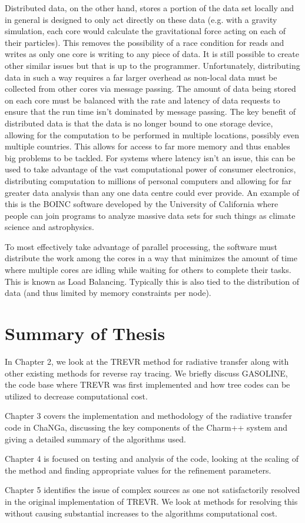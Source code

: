 Distributed data, on the other hand, stores a portion of the data set locally and in general is designed to only act directly on these data (e.g. with a gravity simulation, each core would calculate the gravitational force acting on each of their particles). This removes the possibility of a race condition for reads and writes as only one core is writing to any piece of data. It is still possible to create other similar issues but that is up to the programmer. Unfortunately, distributing data in such a way requires a far larger overhead as non-local data must be collected from other cores via message passing. The amount of data being stored on each core must be balanced with the rate and latency of data requests to ensure that the run time isn't dominated by message passing. The key benefit of distributed data is that the data is no longer bound to one storage device, allowing for the computation to be performed in multiple locations, possibly even multiple countries. This allows for access to far more memory and thus enables big problems to be tackled. For systems where latency isn't an issue, this can be used to take advantage of the vast computational power of consumer electronics, distributing computation to millions of personal computers and allowing for far greater data analysis than any one data centre could ever provide. An example of this is the BOINC software developed by the University of California \citep{boinc} where people can join programs to analyze massive data sets for such things as climate science and astrophysics.

To most effectively take advantage of parallel processing, the software must distribute the work among the cores in a way that minimizes the amount of time where multiple cores are idling while waiting for others to complete their tasks. This is known as Load Balancing. Typically this is also tied to the distribution of data (and thus limited by memory constraints per node).

\section{Summary of Thesis}

In Chapter 2, we look at the TREVR method for radiative transfer along with other existing methods for reverse ray tracing. We briefly discuss GASOLINE, the code base where TREVR was first implemented and how tree codes can be utilized to decrease computational cost.

Chapter 3 covers the implementation and methodology of the radiative transfer code in ChaNGa, discussing the key components of the Charm++ system and giving a detailed summary of the algorithms used.

Chapter 4 is focused on testing and analysis of the code, looking at the scaling of the method and finding appropriate values for the refinement parameters. 

Chapter 5 identifies the issue of complex sources as one not satisfactorily resolved in the original implementation of TREVR. We look at methods for resolving this without causing substantial increases to the algorithms computational cost.
